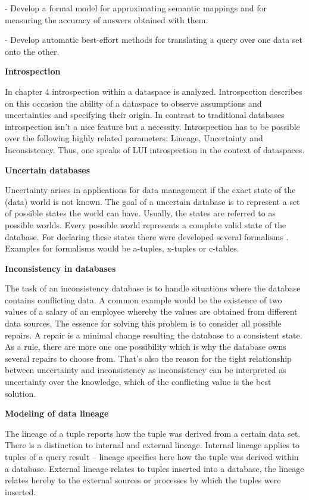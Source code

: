 - Develop a formal model  for approximating semantic mappings and for measuring the accuracy of answers obtained with them.

- Develop automatic best-effort methods for translating a query over one data set onto the other.

\textbf{Introspection}

In chapter 4 introspection within a dataspace is analyzed. Introspection describes on this occasion the ability of a dataspace to observe assumptions and uncertainties and specifying their origin. In contrast to traditional databases introspection isn't a nice feature but a necessity. Introspection has to be possible over the following highly related parameters: Lineage, Uncertainty and Inconsistency. Thus, one speaks of LUI introspection in the context of dataspaces.

\textbf{Uncertain databases }

Uncertainty arises in applications for data management if the exact state of the (data) world is not known. The goal of a uncertain database is to represent a set of possible states the world can have. Usually, the states are referred to as possible worlds. Every possible world represents a complete valid state of the database. For declaring these states there were developed several formalisms \cite{FoundationOfDatabases1995, Barbara:1992:MPD:627288.627535, WorkingModelsForUncertainData, Grahne:1984:DSD:645912.671297, Lakshmanan:1997:PFP:261124.261131}. Examples for formalisms would be a-tuples, x-tuples or c-tables\cite{DBLP:reference/db/Grahne09a}.


\textbf{Inconsistency in databases}

The task of an inconsistency database is to handle situations where the database contains conflicting data. A common example would be the existence of two values of a salary of an employee whereby the values are obtained from different data sources. The essence for solving this problem is to consider all possible repairs. A repair is a minimal change resulting the database to a consistent state. As a rule, there are more one one possibility which is why the database owns several repairs to choose from. That's also the reason for the tight relationship between uncertainty and inconsistency as inconsistency can be interpreted as uncertainty over the knowledge, which of the conflicting value is the best solution.

\textbf{Modeling of data lineage}

The lineage of a tuple reports how the tuple was derived from a certain data set. There is a distinction to internal and external lineage. Internal lineage applies to tuples of a query result -- lineage specifies here how the tuple was derived within a database. External lineage relates to tuples inserted into a database, the lineage relates hereby to the external sources or processes by which the tuples were inserted. 

